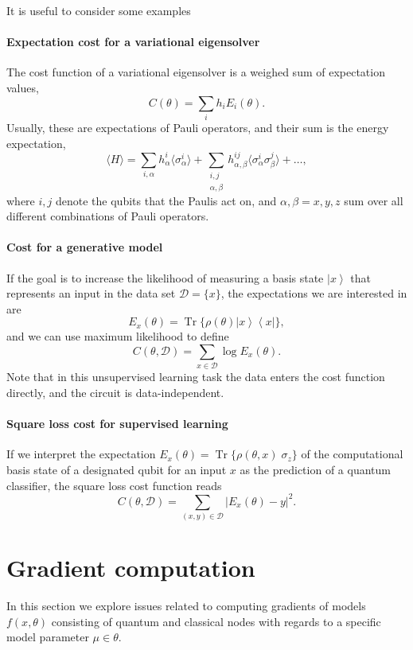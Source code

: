 \documentclass[aps,pra,10pt,twocolumn,groupedaddress,nofootinbib]{revtex4-1}
\theoremstyle{plain}
\DeclareMathOperator{\tr}{Tr}
\newcommand{\be}{\begin{equation}}
\newcommand{\ee}{\end{equation}}
\newcommand{\ket}[1]{\ensuremath{\left| #1 \right \rangle}}
\newcommand{\bra}[1]{\ensuremath{\left \langle #1 \right |}}
\newcommand{\ketbra}[2]{\ket{#1}\bra{#2}}
\begin{document}
It is useful to consider some examples
\paragraph{Expectation cost for a variational eigensolver}

The cost function of a variational eigensolver is a weighed sum of expectation values,
\[ C(\theta) = \sum_i h_i E_i(\theta). \]
Usually, these are expectations of Pauli operators, and their sum is the energy expectation,
\[\langle H \rangle = \sum\limits_{i, \alpha} h^i_{\alpha} \langle\sigma^i_{\alpha}\rangle + \sum\limits_{\substack{i,j\\ \alpha, \beta}} h^{ij}_{\alpha, \beta} \langle \sigma^i_{\alpha}\sigma^j_{\beta}\rangle + \hdots,\]
where $i,j$ denote the qubits that the Paulis act on, and
$\alpha, \beta = x,y,z$ sum over all different combinations of Pauli operators.

\paragraph{Cost for a generative model}
If the goal is to increase the likelihood of measuring a basis state
$\ket{x}$ that represents an input in the data set
$\mathcal{D} = \{x\}$, the expectations we are interested in are
\be
E_x(\theta) =  \tr\{\rho(\theta) \ketbra{x}{x}  \},
\ee
and we can use maximum likelihood to define
\[C(\theta, \mathcal{D}) = \sum_{x \in \mathcal{D}}\log E_x(\theta) .\]
Note that in this unsupervised learning task the data enters the cost function directly, and the circuit is data-independent.



\paragraph{Square loss cost for supervised learning}
If we interpret the expectation $E_x(\theta) = \tr \{ \rho(\theta, x)
\; \sigma_z \}$ of the computational basis state of a designated qubit
for an input $x$ as the prediction of a quantum classifier, the square
loss cost function reads
\[ C(\theta, \mathcal{D}) = \sum_{(x,y) \in \mathcal{D}} |E_x(\theta)-y|^2. \]

\color{black}


\section{Gradient computation}

In this section we explore issues related to computing gradients of models $f(x, \theta)$ consisting of quantum and classical nodes with regards to a specific model parameter $\mu \in \theta$.\\
\end{document}
